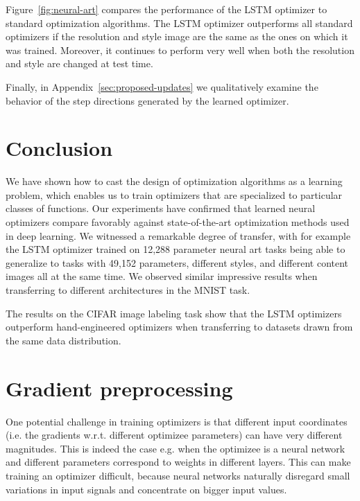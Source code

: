 \documentclass{article}
\begin{document}
Figure~\ref{fig:neural-art} compares the performance of the LSTM optimizer to
standard optimization algorithms.  The LSTM optimizer outperforms all standard
optimizers if the resolution and style image are the same as the ones on which
it was trained.  Moreover, it continues to perform very well when both the
resolution and style are changed at test time.

Finally, in Appendix~\ref{sec:proposed-updates} we qualitatively examine the
behavior of the step directions generated by the learned optimizer.

\section{Conclusion}

We have shown how to cast the design of optimization algorithms as a learning
problem, which enables us to train optimizers that are specialized to
particular classes of functions.  Our experiments have confirmed that learned
neural optimizers compare favorably against state-of-the-art optimization
methods used in deep learning. We witnessed a remarkable degree of transfer,
with for example the LSTM optimizer trained on 12,288 parameter neural art
tasks being able to generalize to tasks with 49,152 parameters, different
styles, and different content images all at the same time. We observed similar
impressive results when transferring to different architectures in the MNIST
task.

The results on the CIFAR image labeling task show that the LSTM optimizers
outperform hand-engineered optimizers when transferring to datasets drawn from
the same data distribution.

{
\setlength{\bibsep}{0.4pt}
\renewcommand{\bibfont}{\small}
\titlespacing*{\section}{0pt}{0pt}{0pt}


}

\newpage
\appendix

\section{Gradient preprocessing}\label{sec:pre}

One potential challenge in training optimizers is that different input coordinates (i.e. the gradients w.r.t. different
optimizee parameters) can have very different magnitudes.
This is indeed the case e.g. when the optimizee is a neural network and different parameters
correspond to weights in different layers.
This can make training an optimizer difficult, because neural networks
naturally disregard small variations in input signals and concentrate on bigger input values.
\end{document}
